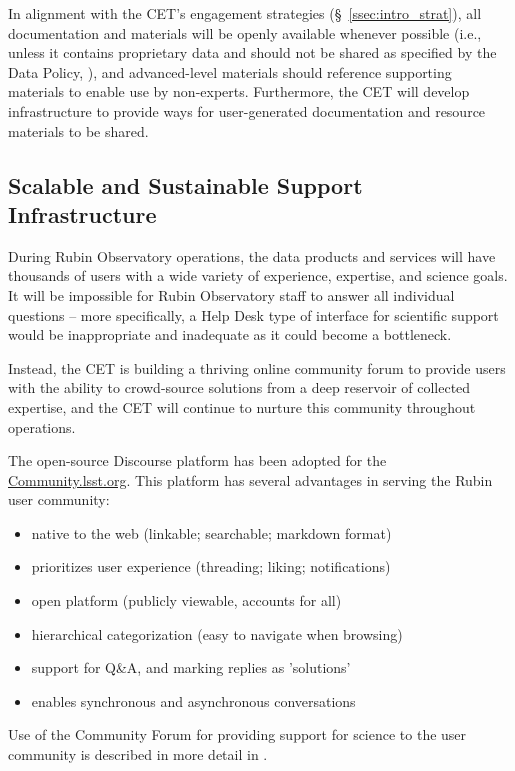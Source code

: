 \documentclass[DM,lsstdraft,toc]{lsstdoc}
\begin{document}
In alignment with the CET's engagement strategies (\S~\ref{ssec:intro_strat}), all documentation and materials will be openly available whenever possible (i.e., unless it contains proprietary data and should not be shared as specified by the Data Policy, ), and advanced-level materials should reference supporting materials to enable use by non-experts.
Furthermore, the CET will develop infrastructure to provide ways for user-generated documentation and resource materials to be shared.


\subsection{Scalable and Sustainable Support Infrastructure}\label{ssec:mod_support}

During Rubin Observatory operations, the data products and services will have thousands of users with a wide variety of experience, expertise, and science goals.
It will be impossible for Rubin Observatory staff to answer all individual questions -- more specifically, a Help Desk type of interface for scientific support would be inappropriate and inadequate as it could become a bottleneck.

Instead, the CET is building a thriving online community forum to provide users with the ability to crowd-source solutions from a deep reservoir of collected expertise, and the CET will continue to nurture this community throughout operations.

The open-source Discourse platform has been adopted for the \url{Community.lsst.org}.
This platform has several advantages in serving the Rubin user community:
\begin{itemize}
\item native to the web (linkable; searchable; markdown format)
\item prioritizes user experience (threading; liking; notifications)
\item open platform (publicly viewable, accounts for all)
\item hierarchical categorization (easy to navigate when browsing)
\item support for Q\&A, and marking replies as 'solutions'
\item enables synchronous and asynchronous conversations
\end{itemize}

Use of the Community Forum for providing support for science to the user community is described in more detail in .
\end{document}
